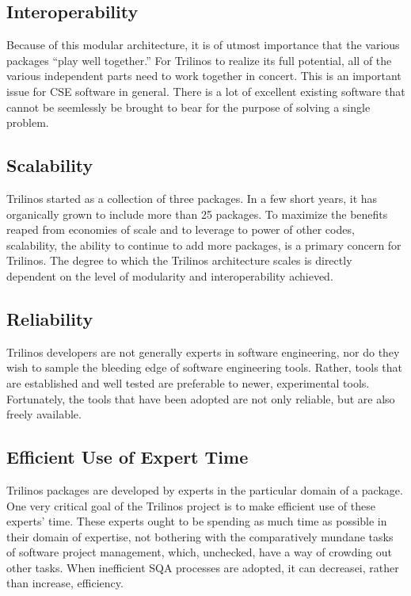 \documentclass[12pt,relax]{article}
\begin{document}
\subsection{Interoperability}
Because of this modular architecture, it is of utmost importance that the
various packages ``play well together.''  For Trilinos to realize its full
potential, all of the various independent parts need to work together in
concert.  This is an important issue for CSE software in general.  There 
is a lot of excellent existing software that cannot be seemlessly be 
brought to bear for the purpose of solving a single problem.

\subsection{Scalability}
Trilinos started as a collection of three packages.  In a few short years, it
has organically grown to include more than 25 packages.  To maximize the
benefits reaped from economies of scale and to leverage to power of other
codes, scalability, the ability to continue to add more packages, is a primary
concern for Trilinos.  The degree to which the Trilinos architecture scales
is directly dependent on the level of modularity and interoperability achieved.

\subsection{Reliability}
Trilinos developers are not generally experts in software engineering, nor do
they wish to sample the bleeding edge of software engineering 
tools.  Rather, tools that are established and well tested are preferable
to newer, experimental tools.  Fortunately, the tools that have been adopted 
are not only reliable, but are also freely available.



\subsection{Efficient Use of Expert Time}
Trilinos packages are developed by experts in the particular domain of a
package.  One very critical goal of the Trilinos project is to make efficient
use of these experts' time.  These experts ought to be spending as much time as
possible in their domain of expertise, not bothering with the comparatively
mundane tasks of software project management, which, unchecked, have a way of
crowding out other tasks.  When inefficient SQA processes are adopted, it can 
decreasei, rather than increase, efficiency.
\end{document}
